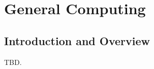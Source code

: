 \chapter{General Computing}        
\label{cgct0}

\section{Introduction and Overview}
\label{cgct0:sint0}

TBD.

